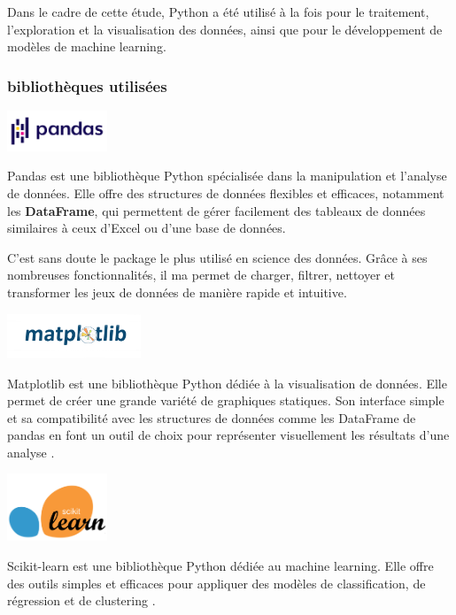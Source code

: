 Dans le cadre de cette étude, Python a été utilisé à la fois pour le traitement, l’exploration et la visualisation des données,
ainsi que pour le développement de modèles de machine learning.

\subsubsection{bibliothèques utilisées}

\includegraphics[width=3cm]{images/Pandas_logo.png}

Pandas est une bibliothèque Python spécialisée dans la manipulation et l’analyse de données. 
Elle offre des structures de données flexibles et efficaces, notamment les \textbf{DataFrame}, 
qui permettent de gérer facilement des tableaux de données similaires à ceux d'Excel ou d'une base de données\cite{pandas}.

C’est sans doute le package le plus utilisé en science des données. Grâce à ses nombreuses fonctionnalités,
il ma permet de charger, filtrer, nettoyer et transformer les jeux de données de manière rapide et intuitive.

\includegraphics[width=4cm]{images/Matplotlib.png}

Matplotlib est une bibliothèque Python dédiée à la visualisation de données. 
Elle permet de créer une grande variété de graphiques statiques. 
Son interface simple et sa compatibilité avec les structures de données 
comme les DataFrame de pandas en font un outil de choix pour représenter visuellement les résultats d’une analyse \cite{matplotlib}.

\includegraphics[width=3cm]{images/sckitlearn.png}

Scikit-learn est une bibliothèque Python dédiée au machine learning. 
Elle offre des outils simples et efficaces pour appliquer des modèles de classification, de régression et de clustering \cite{scikitLearn}.

